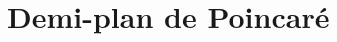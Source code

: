 \documentclass{article}
\begin{document}
\section{Demi-plan de Poincaré}
\begin{definition}
    
\end{definition}
\end{document}
